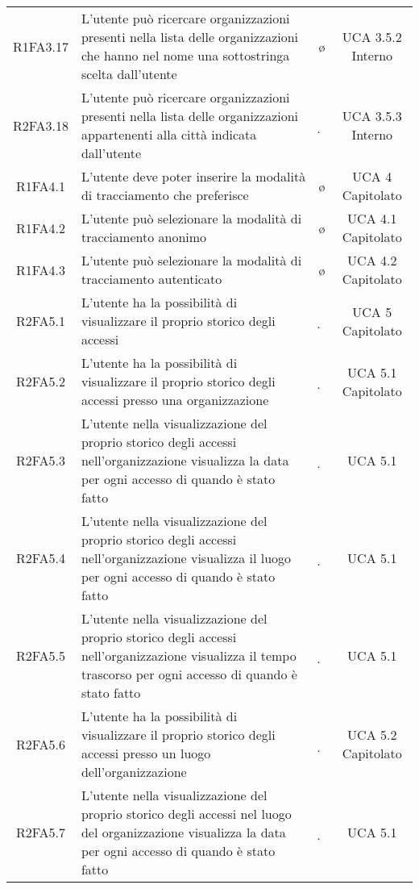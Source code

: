 {\begin{longtable}{ c C{8cm} c c}
R1FA3.17 & L’utente può ricercare organizzazioni presenti nella lista delle organizzazioni che hanno nel nome una sottostringa scelta dall'utente & \o & UCA 3.5.2 Interno \\

R2FA3.18 & L’utente può ricercare organizzazioni presenti nella lista delle organizzazioni appartenenti alla città indicata dall’utente & \d & UCA 3.5.3 Interno \\

R1FA4.1 & L’utente deve poter inserire la modalità di tracciamento che preferisce & \o & UCA 4 Capitolato \\

R1FA4.2 & L’utente può selezionare la modalità di tracciamento anonimo & \o & UCA 4.1 Capitolato \\

R1FA4.3 & L’utente può selezionare la modalità di tracciamento autenticato & \o & UCA 4.2 Capitolato \\

R2FA5.1 & L’utente ha la possibilità di visualizzare il proprio storico degli accessi & \d & UCA 5 Capitolato \\

R2FA5.2 & L’utente ha la possibilità di visualizzare il proprio storico degli accessi presso una organizzazione  & \d & UCA 5.1 Capitolato \\

R2FA5.3 & L'utente nella visualizzazione del proprio storico degli accessi nell'organizzazione visualizza la data per ogni accesso di quando è stato fatto & \d &  UCA 5.1 \\

R2FA5.4 & L'utente nella visualizzazione del proprio storico degli accessi nell'organizzazione visualizza il luogo per ogni accesso di quando è stato fatto & \d &  UCA 5.1 \\

R2FA5.5 & L'utente nella visualizzazione del proprio storico degli accessi nell'organizzazione visualizza il tempo trascorso per ogni accesso di quando è stato fatto & \d &  UCA 5.1 \\

R2FA5.6 & L’utente ha la possibilità di visualizzare il proprio storico degli accessi presso un luogo dell’organizzazione & \d & UCA 5.2 Capitolato\\

R2FA5.7 & L'utente nella visualizzazione del proprio storico degli accessi nel luogo del organizzazione visualizza la data per ogni accesso di quando è stato fatto & \d &  UCA 5.1 \\


\end{longtable}}

